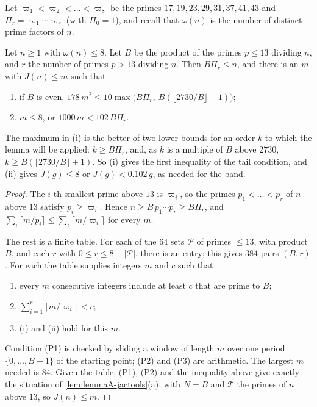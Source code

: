 Let $\varpi_1<\varpi_2<\dots<\varpi_8$ be the primes $17,19,23,29,31,37,41,43$ and
$\Pi_r=\varpi_1\cdots \varpi_r$ (with $\Pi_0=1$), and recall that $\omega(n)$ is the
number of distinct prime factors of $n$.

\begin{lemma}
\label{lem:lemmaA-pattern}
Let $n\ge1$ with $\omega(n)\le8$. Let $B$ be the product of the primes
$p\le13$ dividing $n$, and $r$ the number of primes $p>13$ dividing $n$.
Then $B\Pi_r\le n$, and there is an $m$ with $J(n)\le m$ such that
\begin{enumerate}
\item[(i)] if $B$ is even, $178\,m^2\le10\max\bigl(B\Pi_r,\
B(\lfloor2730/B\rfloor+1)\bigr)$;
\item[(ii)] $m\le8$, or $1000\,m<102\,B\Pi_r$.
\end{enumerate}
\end{lemma}

The maximum in (i) is the better of two lower bounds for an order $k$ to
which the lemma will be applied: $k\ge B\Pi_r$, and, as $k$ is a multiple
of $B$ above $2730$, $k\ge B(\lfloor2730/B\rfloor+1)$. So (i) gives the first
inequality of the tail condition, and (ii) gives $J(g)\le8$ or
$J(g)<0.102\,g$, as needed for the band.

\begin{proof}
The $i$-th smallest prime above $13$ is $\varpi_i$, so the primes
$p_1<\dots<p_r$ of $n$ above $13$ satisfy $p_i\ge \varpi_i$. Hence
$n\ge B\,p_1\cdots p_r\ge B\Pi_r$, and
$\sum_i\lceil m/p_i\rceil\le\sum_i\lceil m/\varpi_i\rceil$ for every $m$.

The rest is a finite table. For each of the $64$ sets $\mathcal P$ of primes
$\le13$, with product $B$, and each $r$ with $0\le r\le8-|\mathcal P|$, there is an
entry; this gives $384$ pairs $(B,r)$. For each the table supplies integers
$m$ and $c$ such that
\begin{enumerate}
\item[(P1)] every $m$ consecutive integers include at least $c$ that are
prime to $B$;
\item[(P2)] $\sum_{i=1}^r\lceil m/\varpi_i\rceil<c$;
\item[(P3)] (i) and (ii) hold for this $m$.
\end{enumerate}
Condition (P1) is checked by sliding a window of length $m$ over one period
$\{0,\dots,B-1\}$ of the starting point; (P2) and (P3) are arithmetic. The
largest $m$ needed is $84$. Given the table, (P1), (P2)
and the inequality above give exactly the situation of
\autoref{lem:lemmaA-jactools}(a), with $N=B$ and $\mathcal T$ the primes of
$n$ above $13$, so $J(n)\le m$.
\end{proof}


